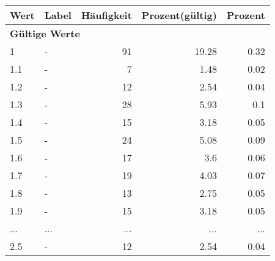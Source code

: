      \begin{longtable}{lXrrr}
     \toprule
     \textbf{Wert} & \textbf{Label} & \textbf{Häufigkeit} & \textbf{Prozent(gültig)} & \textbf{Prozent} \\
     \endhead
     \midrule
     \multicolumn{5}{l}{\textbf{Gültige Werte}}\\
        1 & \multicolumn{1}{X}{-} & %
          \num{91} &
          \num[round-mode=places,round-precision=2]{19.28} &
          \num[round-mode=places,round-precision=2]{0.32} \\
        1.1 & \multicolumn{1}{X}{-} & %
          \num{7} &
          \num[round-mode=places,round-precision=2]{1.48} &
          \num[round-mode=places,round-precision=2]{0.02} \\
        1.2 & \multicolumn{1}{X}{-} & %
          \num{12} &
          \num[round-mode=places,round-precision=2]{2.54} &
          \num[round-mode=places,round-precision=2]{0.04} \\
        1.3 & \multicolumn{1}{X}{-} & %
          \num{28} &
          \num[round-mode=places,round-precision=2]{5.93} &
          \num[round-mode=places,round-precision=2]{0.1} \\
        1.4 & \multicolumn{1}{X}{-} & %
          \num{15} &
          \num[round-mode=places,round-precision=2]{3.18} &
          \num[round-mode=places,round-precision=2]{0.05} \\
        1.5 & \multicolumn{1}{X}{-} & %
          \num{24} &
          \num[round-mode=places,round-precision=2]{5.08} &
          \num[round-mode=places,round-precision=2]{0.09} \\
        1.6 & \multicolumn{1}{X}{-} & %
          \num{17} &
          \num[round-mode=places,round-precision=2]{3.6} &
          \num[round-mode=places,round-precision=2]{0.06} \\
        1.7 & \multicolumn{1}{X}{-} & %
          \num{19} &
          \num[round-mode=places,round-precision=2]{4.03} &
          \num[round-mode=places,round-precision=2]{0.07} \\
        1.8 & \multicolumn{1}{X}{-} & %
          \num{13} &
          \num[round-mode=places,round-precision=2]{2.75} &
          \num[round-mode=places,round-precision=2]{0.05} \\
        1.9 & \multicolumn{1}{X}{-} & %
          \num{15} &
          \num[round-mode=places,round-precision=2]{3.18} &
          \num[round-mode=places,round-precision=2]{0.05} \\
       ... & ... & ... & ... & ... \\
        2.5 & \multicolumn{1}{X}{-} & %
          \num{12} &
          \num[round-mode=places,round-precision=2]{2.54} &
          \num[round-mode=places,round-precision=2]{0.04} \\


\end{longtable}
